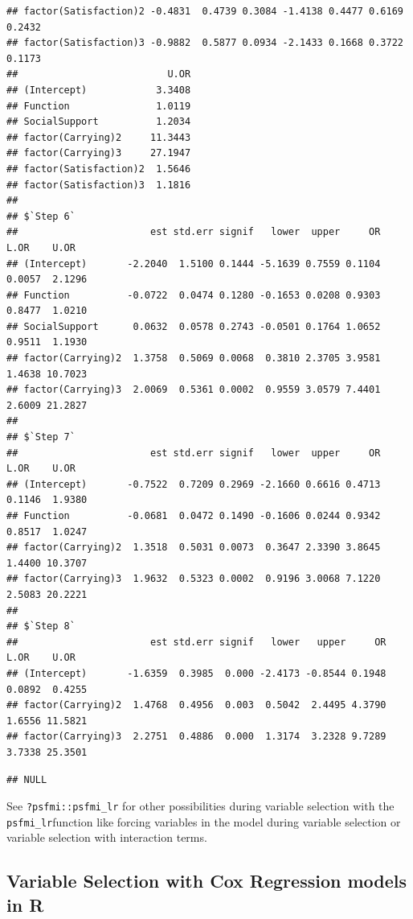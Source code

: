 \documentclass[
]{book}
\newenvironment{Shaded}{\begin{snugshade}}{\end{snugshade}}
\newcommand{\NormalTok}[1]{#1}
\newcommand{\OperatorTok}[1]{\textcolor[rgb]{0.81,0.36,0.00}{\textbf{#1}}}
\begin{document}
\begin{verbatim}
## factor(Satisfaction)2 -0.4831  0.4739 0.3084 -1.4138 0.4477 0.6169 0.2432
## factor(Satisfaction)3 -0.9882  0.5877 0.0934 -2.1433 0.1668 0.3722 0.1173
##                          U.OR
## (Intercept)            3.3408
## Function               1.0119
## SocialSupport          1.2034
## factor(Carrying)2     11.3443
## factor(Carrying)3     27.1947
## factor(Satisfaction)2  1.5646
## factor(Satisfaction)3  1.1816
## 
## $`Step 6`
##                       est std.err signif   lower  upper     OR   L.OR    U.OR
## (Intercept)       -2.2040  1.5100 0.1444 -5.1639 0.7559 0.1104 0.0057  2.1296
## Function          -0.0722  0.0474 0.1280 -0.1653 0.0208 0.9303 0.8477  1.0210
## SocialSupport      0.0632  0.0578 0.2743 -0.0501 0.1764 1.0652 0.9511  1.1930
## factor(Carrying)2  1.3758  0.5069 0.0068  0.3810 2.3705 3.9581 1.4638 10.7023
## factor(Carrying)3  2.0069  0.5361 0.0002  0.9559 3.0579 7.4401 2.6009 21.2827
## 
## $`Step 7`
##                       est std.err signif   lower  upper     OR   L.OR    U.OR
## (Intercept)       -0.7522  0.7209 0.2969 -2.1660 0.6616 0.4713 0.1146  1.9380
## Function          -0.0681  0.0472 0.1490 -0.1606 0.0244 0.9342 0.8517  1.0247
## factor(Carrying)2  1.3518  0.5031 0.0073  0.3647 2.3390 3.8645 1.4400 10.3707
## factor(Carrying)3  1.9632  0.5323 0.0002  0.9196 3.0068 7.1220 2.5083 20.2221
## 
## $`Step 8`
##                       est std.err signif   lower   upper     OR   L.OR    U.OR
## (Intercept)       -1.6359  0.3985  0.000 -2.4173 -0.8544 0.1948 0.0892  0.4255
## factor(Carrying)2  1.4768  0.4956  0.003  0.5042  2.4495 4.3790 1.6556 11.5821
## factor(Carrying)3  2.2751  0.4886  0.000  1.3174  3.2328 9.7289 3.7338 25.3501
\end{verbatim}

\begin{Shaded}
\end{Shaded}

\begin{verbatim}
## NULL
\end{verbatim}

See \texttt{?psfmi::psfmi\_lr} for other possibilities during variable
selection with the \texttt{psfmi\_lr}function like forcing variables in
the model during variable selection or variable selection with
interaction terms.

\hypertarget{variable-selection-with-cox-regression-models-in-r}{%
\subsection{Variable Selection with Cox Regression models in
R}\label{variable-selection-with-cox-regression-models-in-r}}
\end{document}

